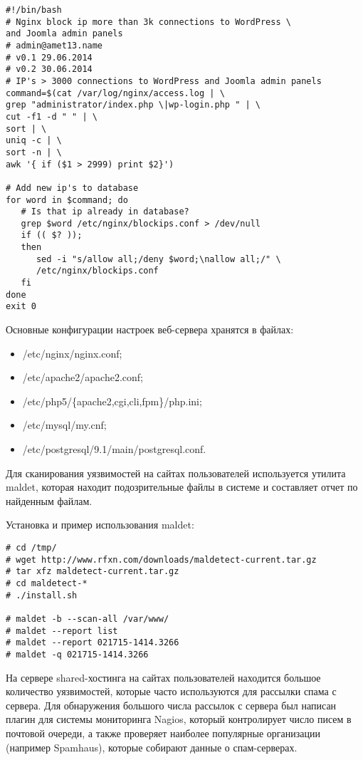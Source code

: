 \begin{lstlisting}
#!/bin/bash
# Nginx block ip more than 3k connections to WordPress \
and Joomla admin panels
# admin@amet13.name
# v0.1 29.06.2014
# v0.2 30.06.2014
# IP's > 3000 connections to WordPress and Joomla admin panels
command=$(cat /var/log/nginx/access.log | \
grep "administrator/index.php \|wp-login.php " | \
cut -f1 -d " " | \
sort | \
uniq -c | \
sort -n | \
awk '{ if ($1 > 2999) print $2}')

# Add new ip's to database
for word in $command; do
   # Is that ip already in database?
   grep $word /etc/nginx/blockips.conf > /dev/null
   if (( $? ));
   then 
      sed -i "s/allow all;/deny $word;\nallow all;/" \
      /etc/nginx/blockips.conf
   fi
done
exit 0
\end{lstlisting}

Основные конфигурации настроек веб-сервера хранятся в файлах:
\begin{itemize}
  \item /etc/nginx/nginx.conf;
  \item /etc/apache2/apache2.conf;
  \item /etc/php5/\{apache2,cgi,cli,fpm\}/php.ini;
  \item /etc/mysql/my.cnf;
  \item /etc/postgresql/9.1/main/postgresql.conf.
\end{itemize}

Для сканирования уязвимостей на сайтах пользователей используется утилита maldet, которая находит подозрительные файлы в системе и составляет отчет по найденным файлам.

Установка и пример использования maldet:
\begin{lstlisting}
# cd /tmp/
# wget http://www.rfxn.com/downloads/maldetect-current.tar.gz
# tar xfz maldetect-current.tar.gz
# cd maldetect-*
# ./install.sh

# maldet -b --scan-all /var/www/
# maldet --report list
# maldet --report 021715-1414.3266
# maldet -q 021715-1414.3266
\end{lstlisting}

На сервере shared-хостинга на сайтах пользователей находится большое количество уязвимостей, которые часто используются для рассылки спама с сервера.
Для обнаружения большого числа рассылок с сервера был написан плагин для системы мониторинга Nagios, который контролирует число писем в почтовой очереди, а также проверяет наиболее популярные организации (например Spamhaus), которые собирают данные о спам-серверах.

